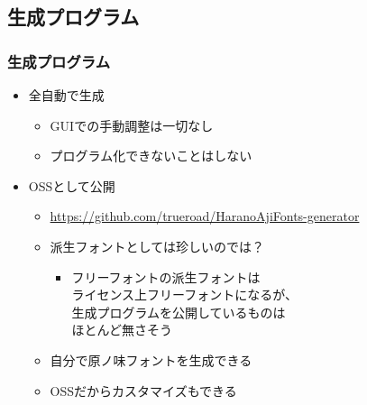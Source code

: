 \subsection{生成プログラム}
\begin{frame}\frametitle{生成プログラム}
  \begin{itemize}
  \item 全自動で生成
    \begin{itemize}
    \item GUIでの手動調整は一切なし
    \item プログラム化できないことはしない
    \end{itemize}
  \item OSSとして公開
    \begin{itemize}
    \item {\tiny
      \url{https://github.com/trueroad/HaranoAjiFonts-generator}}
    \item 派生フォントとしては珍しいのでは？
      \begin{itemize}
      \item フリーフォントの派生フォントは \\
        ライセンス上フリーフォントになるが、 \\
        生成プログラムを公開しているものは \\
        ほとんど無さそう
      \end{itemize}
    \item 自分で原ノ味フォントを生成できる
    \item OSSだからカスタマイズもできる
    \end{itemize}
  \end{itemize}
\end{frame}

